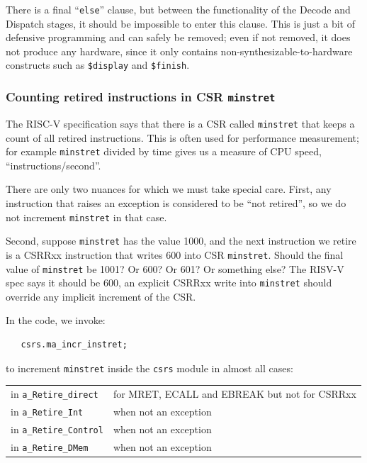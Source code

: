 There is a final ``\verb|else|'' clause, but between the functionality
of the Decode and Dispatch stages, it should be impossible to enter
this clause.  This is just a bit of defensive programming and can
safely be removed; even if not removed, it does not produce any
hardware, since it only contains non-synthesizable-to-hardware
constructs such as \verb|$display| and \verb|$finish|.


\subsubsection{Counting retired instructions in CSR {\tt minstret}}

The RISC-V specification says that there is a CSR called
\verb|minstret| that keeps a count of all retired instructions.  This
is often used for performance measurement; for example \verb|minstret|
divided by time gives us a measure of CPU speed,
``instructions/second''.

There are only two nuances for which we must take special care.
First, any instruction that raises an exception is considered to be
``not retired'', so we do not increment \verb|minstret| in that case.

Second, suppose \verb|minstret| has the value 1000, and the next
instruction we retire is a CSRRxx instruction that writes 600 into CSR
\verb|minstret|.  Should the final value of \verb|minstret| be 1001?
Or 600? Or 601? Or something else?  The RISV-V spec says it should be
600, {\ie} an explicit CSRRxx write into \verb|minstret| should
override any implicit increment of the CSR.

In the {\DRUM} code, we invoke:

{\footnotesize
\begin{Verbatim}
   csrs.ma_incr_instret;
\end{Verbatim}
}

to increment \verb|minstret| inside the \verb|csrs| module in almost
all cases:

\hmm
\begin{tabular}{ll}
 in {\tt a\_Retire\_direct}   & for MRET, ECALL and EBREAK but not for CSRRxx \\
 in {\tt a\_Retire\_Int}      & when not an exception \\
 in {\tt a\_Retire\_Control}  & when not an exception \\
 in {\tt a\_Retire\_DMem}     & when not an exception
\end{tabular}

